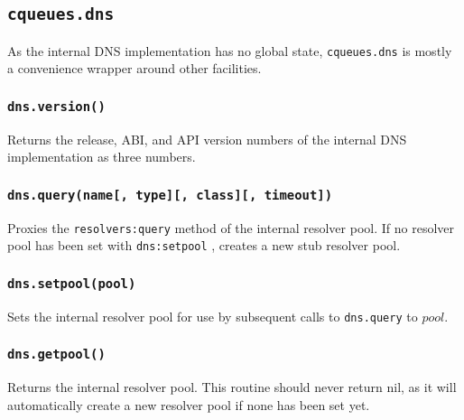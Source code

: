 \documentclass[11pt, oneside]{memoir}
\newcommand{\fn}[1]{\texttt{#1} }
\newcommand{\module}[1]{\texttt{#1} }
\newcounter{toccols}
\newenvironment{Module}[1]{
	\subsection{\texttt{#1}}
	\addtocontents{toc}{
		\protect\begin{multicols}{\value{toccols}}
	}
}{
	\addtocontents{toc}{\protect\end{multicols}}
}
\begin{document}
\begin{Module}{cqueues.dns}

As the internal DNS implementation has no global state, \module{cqueues.dns} is mostly a convenience wrapper around other facilities.

\subsubsection[\fn{dns.version}]{\fn{dns.version()}}

Returns the release, ABI, and API version numbers of the internal DNS implementation as three numbers.

\subsubsection[\fn{dns.query}]{\fn{dns.query(name[, type][, class][, timeout])}}

Proxies the \fn{resolvers:query} method of the internal resolver pool. If no resolver pool has been set with \fn{dns:setpool}, creates a new stub resolver pool.

\subsubsection[\fn{dns.setpool}]{\fn{dns.setpool(pool)}}

Sets the internal resolver pool for use by subsequent calls to \fn{dns.query} to $pool$.

\subsubsection[\fn{dns.getpool}]{\fn{dns.getpool()}}

Returns the internal resolver pool. This routine should never return nil, as it will automatically
create a new resolver pool if none has been set yet.

\end{Module}
\end{document}
